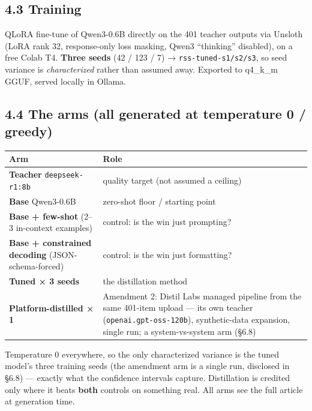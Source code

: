\documentclass[11pt]{article}
\begin{document}
\subsection{4.3 Training}\label{training}

QLoRA fine-tune of Qwen3-0.6B directly on the 401 teacher outputs via
Unsloth (LoRA rank 32, response-only loss masking, Qwen3 ``thinking''
disabled), on a free Colab T4. \textbf{Three seeds} (42 / 123 / 7) →
\texttt{rss-tuned-s1/s2/s3}, so seed variance is \emph{characterized}
rather than assumed away. Exported to q4\_k\_m GGUF, served locally in
Ollama.

\subsection{4.4 The arms (all generated at temperature 0 /
greedy)}\label{the-arms-all-generated-at-temperature-0-greedy}

\begin{longtable}[]{@{}
  >{\raggedright\arraybackslash}p{}
  >{\raggedright\arraybackslash}p{}@{}}
\toprule\noalign{}
\begin{minipage}[b]{\linewidth}\raggedright
Arm
\end{minipage} & \begin{minipage}[b]{\linewidth}\raggedright
Role
\end{minipage} \\
\midrule\noalign{}
\endhead
\bottomrule\noalign{}
\endlastfoot
\textbf{Teacher} \texttt{deepseek-r1:8b} & quality target (not assumed a
ceiling) \\
\textbf{Base} Qwen3-0.6B & zero-shot floor / starting point \\
\textbf{Base + few-shot} (2--3 in-context examples) & control: is the
win just prompting? \\
\textbf{Base + constrained decoding} (JSON-schema-forced) & control: is
the win just formatting? \\
\textbf{Tuned × 3 seeds} & the distillation method \\
\textbf{Platform-distilled × 1} & Amendment 2: Distil Labs managed
pipeline from the same 401-item upload --- its own teacher
(\texttt{openai.gpt-oss-120b}), synthetic-data expansion, single run; a
system-vs-system arm (§6.8) \\
\end{longtable}

Temperature 0 everywhere, so the only characterized variance is the
tuned model's three training seeds (the amendment arm is a single run,
disclosed in §6.8) --- exactly what the confidence intervals capture.
Distillation is credited only where it beats \textbf{both} controls on
something real. All arms see the full article at generation time.
\end{document}
